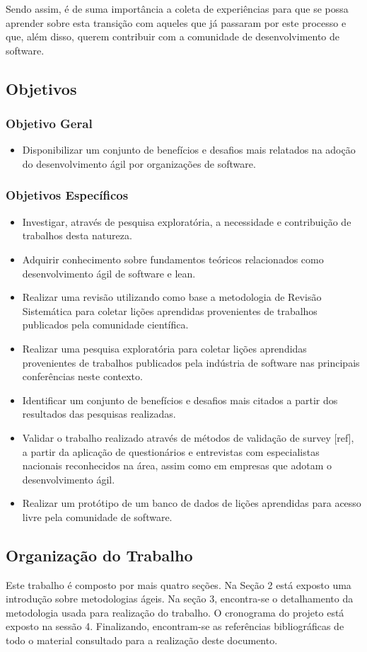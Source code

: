 \documentclass[a4paper,11pt]{article}
\begin{document}
Sendo assim, é de suma importância a coleta de experiências para que se possa aprender sobre esta transição com aqueles que já passaram por este processo e que, além disso, querem contribuir com a comunidade de desenvolvimento de software.
\subsection{Objetivos}
\subsubsection{Objetivo Geral}
\begin{itemize}
	\item Disponibilizar um conjunto de benefícios e desafios mais relatados na adoção do desenvolvimento ágil por organizações de software.
\end{itemize}
\subsubsection{Objetivos Específicos}
\begin{itemize}
	\item Investigar, através de pesquisa exploratória, a necessidade e contribuição de trabalhos desta natureza.
	\item Adquirir conhecimento sobre fundamentos teóricos relacionados como desenvolvimento ágil de software e lean.
	\item Realizar uma revisão utilizando como base a metodologia de Revisão Sistemática \cite{Barbara2004} para coletar lições aprendidas provenientes de trabalhos publicados pela comunidade científica.
	\item Realizar uma pesquisa exploratória para coletar lições aprendidas provenientes de trabalhos publicados pela indústria de software nas principais conferências neste contexto.
	\item Identificar um conjunto de benefícios e desafios mais citados a partir dos resultados das pesquisas realizadas.
	\item Validar o trabalho realizado através de métodos de validação de survey [ref], a partir da aplicação de questionários e entrevistas com especialistas nacionais reconhecidos na área, assim como em empresas que adotam o desenvolvimento ágil.
	\item Realizar um protótipo de um banco de dados de lições aprendidas para acesso livre pela comunidade de software.
\end{itemize}
\subsection{Organização do Trabalho}
Este trabalho é composto por mais quatro seções. Na Seção 2 está exposto uma introdução sobre metodologias ágeis. Na seção 3,  encontra-se o detalhamento da metodologia usada para realização do trabalho. O cronograma do projeto está exposto na sessão 4. Finalizando, encontram-se as referências bibliográficas de todo o material consultado para a realização deste documento.
\end{document}
